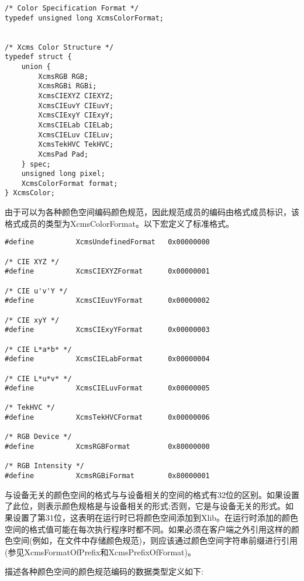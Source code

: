 \begin{lstlisting}
/* Color Specification Format */
typedef unsigned long XcmsColorFormat;			


/* Xcms Color Structure */
typedef struct {
	union {
		XcmsRGB RGB;
		XcmsRGBi RGBi;
		XcmsCIEXYZ CIEXYZ;
		XcmsCIEuvY CIEuvY;
		XcmsCIExyY CIExyY;
		XcmsCIELab CIELab;
		XcmsCIELuv CIELuv;
		XcmsTekHVC TekHVC;
		XcmsPad Pad;
	} spec;
	unsigned long pixel;
	XcmsColorFormat format;
} XcmsColor;			
\end{lstlisting}

由于可以为各种颜色空间编码颜色规范，因此规范成员的编码由格式成员标识，该格式成员的类型为XcmsColorFormat。以下宏定义了标准格式。

\begin{lstlisting}
#define          XcmsUndefinedFormat   0x00000000

/* CIE XYZ */
#define          XcmsCIEXYZFormat      0x00000001

/* CIE u'v'Y */  
#define          XcmsCIEuvYFormat      0x00000002

/* CIE xyY */  
#define          XcmsCIExyYFormat      0x00000003  

/* CIE L*a*b* */
#define          XcmsCIELabFormat      0x00000004  

/* CIE L*u*v* */
#define          XcmsCIELuvFormat      0x00000005

/* TekHVC */  
#define          XcmsTekHVCFormat      0x00000006  

/* RGB Device */
#define          XcmsRGBFormat         0x80000000  

/* RGB Intensity */
#define          XcmsRGBiFormat        0x80000001  
\end{lstlisting}

与设备无关的颜色空间的格式与与设备相关的空间的格式有32位的区别。如果设置了此位，则表示颜色规格是与设备相关的形式;否则，它是与设备无关的形式。如果设置了第31位，这表明在运行时已将颜色空间添加到Xlib。在运行时添加的颜色空间的格式值可能在每次执行程序时都不同。如果必须在客户端之外引用这样的颜色空间(例如，在文件中存储颜色规范)，则应该通过颜色空间字符串前缀进行引用(参见XcmsFormatOfPrefix和XcmsPrefixOfFormat)。

描述各种颜色空间的颜色规范编码的数据类型定义如下:

